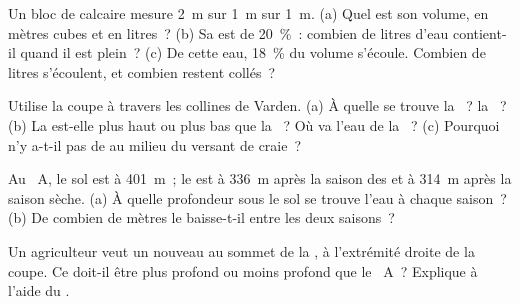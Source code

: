 \begin{exercise}[$\star\star$]\label{exo:g6:water-underground:6}
Un bloc de calcaire mesure 2~m sur 1~m sur 1~m. (a) Quel est son volume,
en mètres cubes et en litres~? (b) Sa  est de 20~\%~: combien de
litres d'eau contient-il quand il est plein~? (c) De cette eau, 18~\% du
volume s'écoule. Combien de litres s'écoulent, et combien restent
collés~?
\end{exercise}

\begin{exercise}[$\star\star$]\label{exo:g6:water-underground:7}
Utilise la coupe à travers les collines de Varden. (a) À quelle 
se trouve la ~? la ~? (b) La  est-elle plus haut ou
plus bas que la ~? Où va l'eau de la ~? (c) Pourquoi n'y
a-t-il pas de  au milieu du versant de craie~?
\end{exercise}

\begin{exercise}[$\star\star$]\label{exo:g6:water-underground:8}
Au ~A, le sol est à 401~m~; le  est à 336~m après
la saison des  et à 314~m après la saison sèche. (a) À quelle
profondeur sous le sol se trouve l'eau à chaque saison~? (b) De combien de
mètres le  baisse-t-il entre les deux saisons~?
\end{exercise}

\begin{exercise}[$\star\star$]\label{exo:g6:water-underground:9}
Un agriculteur veut un nouveau  au sommet de la , à
l'extrémité droite de la coupe. Ce  doit-il être plus profond ou
moins profond que le ~A~? Explique à l'aide du .
\end{exercise}

